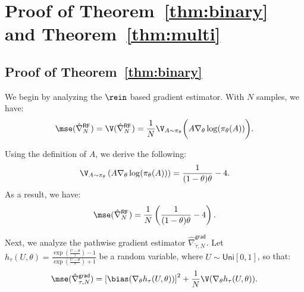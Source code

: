 
\section{Proof of Theorem~\ref{thm:binary} and Theorem~\ref{thm:multi}}

\subsection{Proof of Theorem~\ref{thm:binary}}
\label{sec:proof-thm-binary}

 We begin by analyzing the $\rein$ based gradient estimator.
With $N$ samples, we have: 
\begin{align*}
\mse(\hat{\nabla}^{\mathsf{RF}}_{N})
= \V(\hat{\nabla}^{\mathsf{RF}}_{N})
=\frac{1}{N} \V_{A \sim \pi_\theta} \bigg(A \nabla_\theta \log(\pi_\theta(A)) \bigg).
\end{align*}

Using the definition of $A$, we derive the following:
\begin{align*}
\V_{A \sim \pi_\theta} \left(A \nabla_\theta \log(\pi_\theta(A)) \right) = \frac{1}{(1-\theta) \theta} - 4.
\end{align*}
As a result, we have:
\begin{align}
\mse(\hat{\nabla}^{\mathsf{RF}}_{N}) =  \frac{1}{N
}\left(\frac{1}{(1-\theta) \theta} - 4\right). \label{eqn:mse-rf-bin}
\end{align}

 
Next, we analyze the pathwise gradient estimator $\hat{\nabla}^{\mathsf{grad}}_{\tilde{\tau},N}$.
Let $h_{\tau}(U,\theta) = \frac{\exp\left(\frac{U-\theta}{\tau}\right)-1}{\exp\left(\frac{U-\theta}{\tau}\right)+1}$ 
be a random variable,
where $U \sim \mathsf{Uni}[0,1]$, so that:
\begin{align}
\mse(\hat{\nabla}^{\mathsf{grad}}_{\tau,N}) = \left[
\bias(\nabla_\theta h_{\tau}(U,\theta))\right]^2 + \frac{1}{N} \V(\nabla_\theta h_{\tau}(U,\theta)).
\label{eqn:mse-decompo-bin}
\end{align}


